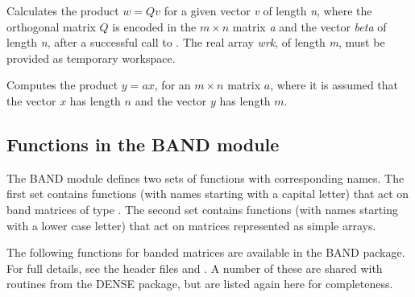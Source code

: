 \documentclass[letterpaper,10pt,english]{sphinxmanual}
\begin{document}

\begin{fulllineitems}
\label{linear_solvers/DLS:c.denseORMQR}
Calculates the product \(w = Qv\) for a given vector \emph{v} of
length \emph{n}, where the orthogonal matrix \(Q\) is encoded in the
\(m \times n\) matrix \emph{a} and the vector \emph{beta} of length \emph{n},
after a successful call to {\hyperref[linear_solvers/DLS:c.denseGEQRF]{\emph{}}}. The real array
\emph{wrk}, of length \emph{m}, must be provided as temporary workspace.

\end{fulllineitems}


\begin{fulllineitems}
\label{linear_solvers/DLS:c.denseMatvec}
Computes the product \(y = ax\), for an \(m\times n\)
matrix \(a\), where it is assumed that the vector \(x\) has
length \(n\) and the vector \(y\) has length \(m\).

\end{fulllineitems}



\subsection{Functions in the BAND module}
\label{linear_solvers/DLS:functions-in-the-band-module}
The BAND module defines two sets of functions with corresponding
names. The first set contains functions (with names starting with a
capital letter) that act on band matrices of type {\hyperref[linear_solvers/DLS:c.DlsMat]{\emph{}}}. The
second set contains functions (with names starting with a lower case
letter) that act on matrices represented as simple arrays.

The following functions for {\hyperref[linear_solvers/DLS:c.DlsMat]{\emph{}}} banded matrices are
available in the BAND package. For full details, see the header files
 and .  A number of these are
shared with routines from the DENSE package, but are listed again here
for completeness.
\end{document}
